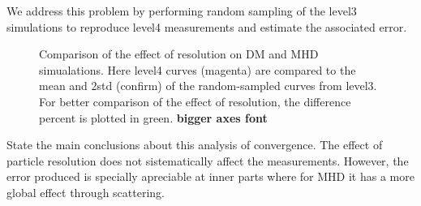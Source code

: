 We address this problem by performing random sampling of the level3 simulations to reproduce level4 measurements and estimate the associated error.\\

\begin{figure}[!ht]
  \centering
  \hfill
  \caption{Comparison of the effect of resolution on DM and MHD simualations. Here level4 curves (magenta) are compared to the mean and 2std (confirm) of the random-sampled curves from level3. For better comparison of the effect of resolution, the difference percent is plotted in green.  \textbf{bigger axes font}}
\end{figure}



State the main conclusions about this analysis of convergence. The effect of particle resolution does not sistematically affect the measurements. However, the error produced is specially apreciable at inner parts where for MHD it has a more global effect through scattering.\\

